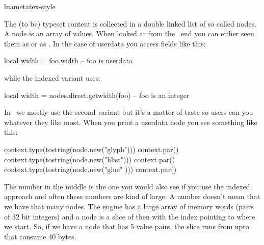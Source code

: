 








\environment luametatex-style

\startdocument[title=Nodes]

\startsection[title={Introduction}]

The (to be) typeset content is collected in a double linked list of so called
nodes. A node is an array of values. When looked at from the \LUA\ end you can
either seen them as  or as . In the case of userdata you access fields like this:

\starttyping [option=LUA]
local width = foo.width -- foo is userdata
\stoptyping

while the indexed variant uses:

\starttyping [option=LUA]
local width = nodes.direct.getwidth(foo) -- foo is an integer
\stoptyping

In \CONTEXT\ we mostly use the second variant but it's a matter of taste so users
can you whatever they like most. When you print a userdata node you see something
like this:

\startlines
\startluacode
context.type(tostring(node.new("glyph"))) context.par()
context.type(tostring(node.new("hlist"))) context.par()
context.type(tostring(node.new("glue" ))) context.par()
\stopluacode
\stoplines

The number in the middle is the one you would also see if you use the indexed
approach and often these numbers are kind of large. A number 
doesn't mean that we have that many nodes. The engine has a large array of memory
words (pairs of 32 bit integers) and a node is a slice of then with the index
pointing to where we start. So, if we have a node that has 5 value pairs, the
slice runs from  upto  that consume 40 bytes.

